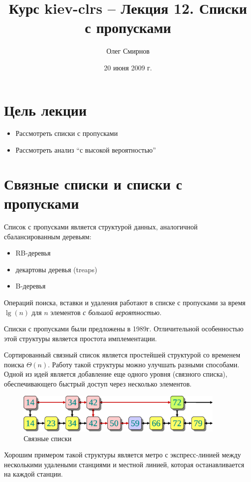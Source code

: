 \documentclass[11pt]{article}
\author{Олег Смирнов}
\title{Курс kiev-clrs -- Лекция 12. Списки с пропусками}
\date{20 июня 2009 г.}
\begin{document}
\maketitle
\tableofcontents

\newpage
\setlength{\parskip}{1ex plus 0.5ex minus 0.2ex}
\section{Цель лекции}
\begin{itemize}
\item Рассмотреть списки с пропусками
\item Рассмотреть анализ ``с высокой вероятностью''
\end{itemize}

\section{Связные списки и списки с пропусками}
Список с пропусками является структурой данных, аналогичной сбалансированным деревьям:
\begin{itemize}
\item RB-деревья
\item декартовы деревья (treaps)
\item B-деревья
\end{itemize}
Операций поиска, вставки и удаления работают в списке с пропусками за время $\lg(n)$ для $n$ элементов \emph{с большой вероятностью}.

Списки с пропусками были предложены в 1989г. Отличительной особенностью этой структуры является простота имплементации.

Сортированный связный список является простейшей структурой со временем поиска $\Theta(n)$. Работу такой структуры можно улучшать разными способами. Одной из идей является добавление еще одного уровня (связного списка), обеспечивающего быстрый доступ через несколько элементов.
\begin{figure}[ht]
  \centering
  \includegraphics[width=4in]{lecture12/linklists.eps}
  \caption{Связные списки}
  \label{fig:linklists}
\end{figure}
Хорошим примером такой структуры является метро с экспресс-линией между несколькими удалеными станциями и местной линией, которая останавливается на каждой станции.
\end{document}
